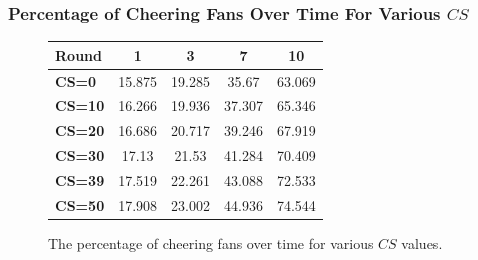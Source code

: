 \documentclass[compress,handout,10pt]{beamer}
\begin{document}
\begin{frame}
\frametitle{Percentage of Cheering Fans Over Time For Various $CS$}
\begin{figure}
\begin{center}
	\begin{tiny}\begin{tabular}{|l|c|c|c|c|}
\hline
\textbf{Round}&1&3&7&10\\\hline
\textbf{CS=0}&15.875&19.285&35.67&63.069\\\hline
\textbf{CS=10}&16.266&19.936&37.307&65.346\\\hline
\textbf{CS=20}&16.686&20.717&39.246&67.919\\\hline
\textbf{CS=30}&17.13&21.53&41.284&70.409\\\hline
\textbf{CS=39}&17.519&22.261&43.088&72.533\\\hline
\textbf{CS=50}&17.908&23.002&44.936&74.544\\\hline
\end{tabular}
\end{tiny}
\end{center}
\caption{{\tiny The percentage of cheering fans over time for various $CS$ values.}}
\end{figure}
\end{frame}
\end{document}
